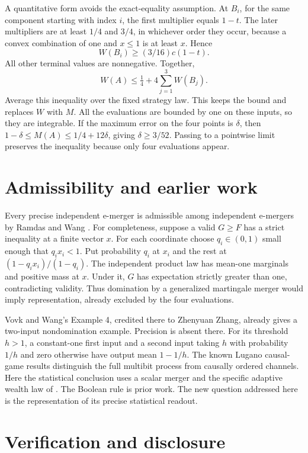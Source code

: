 \documentclass[11pt,a4paper]{amsart}
\begin{document}
A quantitative form avoids the exact-equality assumption.
At \(B_i\), for the same component starting with index \(i\),
the first multiplier equals \(1-t\). The later multipliers
are at least \(1/4\) and \(3/4\), in whichever order they occur,
because a convex combination of one and \(x\leq1\) is at least \(x\).
Hence
\[
 W(B_i)\geq (3/16)c(1-t).
\]
All other terminal values are nonnegative. Together,
\[
 W(A)\leq\tfrac14+4\sum_{j=1}^3W(B_j).
\]
Average this inequality over the fixed strategy law. This keeps the
bound and replaces \(W\) with \(M\). All the evaluations are bounded
by one on these inputs, so they are integrable.
If the maximum error on the four points is \(\delta\), then
\(1-\delta\leq M(A)\leq1/4+12\delta\), giving \(\delta\geq3/52\).
Passing to a pointwise limit preserves the inequality because only
four evaluations appear.

\section{Admissibility and earlier work}

Every precise independent e-merger is admissible among independent
e-mergers by Ramdas and Wang \cite[Prop.~8.6]{rw}.
For completeness, suppose a valid \(G\geq F\) has a strict inequality
at a finite vector \(x\). For each coordinate choose
\(q_i\in(0,1)\) small enough that \(q_i x_i<1\).
Put probability \(q_i\) at \(x_i\) and the rest at
\((1-q_i x_i)/(1-q_i)\). The independent product law has mean-one
marginals and positive mass at \(x\). Under it, \(G\) has expectation
strictly greater than one, contradicting validity. Thus
domination by a generalized martingale merger would imply
representation, already excluded by the four evaluations.

Vovk and Wang's Example 4, credited there to Zhenyuan Zhang,
already gives a two-input nondomination example. Precision is
absent there. For its threshold \(h>1\), a constant-one first input
and a second input taking \(h\) with probability \(1/h\) and zero
otherwise have output mean \(1-1/h\).
The known Lugano causal-game results distinguish the full
multibit process from causally ordered channels.
Here the statistical conclusion uses a scalar merger and the
specific adaptive wealth law of \cite{vw}.
The Boolean rule is prior work. The new question addressed
here is the representation of its precise statistical readout.

\section{Verification and disclosure}
\end{document}
